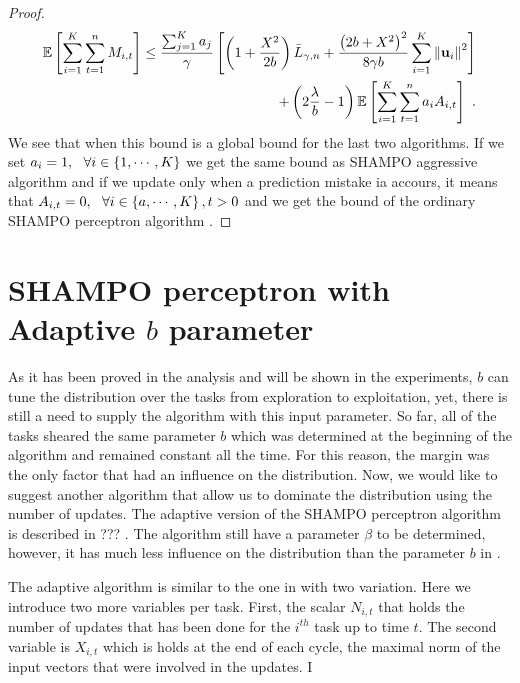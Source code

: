 {\begin{proof}
\begin{equation}
\begin{split}
\mathbb{E}\left[ \sum_{i=1}^{K}\sum_{t=1}^{n}{M_{i,t}} \right]
\le\frac{\sum_{j=1}^Ka_{j}}{\gamma}\left[{\left(1+\frac{X^2}{2b} \right){\bar L}_{\gamma,n}+
\frac{\left({2b+X^2}\right)^2}{8{\gamma}b}\sum_{i=1}^{K}{{\left\Vert \mathbf{u}_{i} \right\Vert}^2}}\right]\\ 
+
\left({2\frac{\lambda}{b}-1}\right)\mathbb{E}\left[{\sum_{i=1}^{K}\sum_{t=1}^{n}{a_{i}A_{i,t}}}\right]~.
\end{split}
\label{final_eq_prior}
\end{equation}
We see that when this  bound is a global bound for the last two algorithms. If we set $a_i=1, ~~\forall i\in\left\{{1,\cdots,K}\right\}$ we get the same bound as  SHAMPO aggressive algorithm and if we update only when a prediction mistake ia accours, it means that $A_{i,t}=0,~~\forall i\in\left\{{a,\cdots,K}\right\},t>0$ and we get the bound of  the ordinary SHAMPO perceptron algorithm  .
\QED
\end{proof}


\section{SHAMPO perceptron with Adaptive $b$ parameter}

As it has been proved in the analysis and will be shown in the experiments, $b$ can tune the distribution over the tasks from exploration to exploitation, yet, there is still a need to supply the algorithm with this input parameter. So far, all of the tasks sheared the same parameter $b$ which was determined at the beginning of the algorithm and remained constant all the time. For this reason, the margin was the only factor that had an influence on the distribution. Now, we would like to suggest another algorithm that allow us to  dominate the distribution using the number of updates. The adaptive version of the  SHAMPO perceptron algorithm is  described in  ??? . The algorithm still have a parameter $\beta$ to be determined, however, it has much less influence on the distribution than the parameter $b$ in  .

The adaptive algorithm is similar to the one in  with two variation. Here we introduce two more variables per task. First, the scalar $N_{i,t}$ that holds the number of updates that has been done for the $i^{th}$ task  up to time $t$. The second variable is $X_{i,t}$ which is holds at the end of each cycle,  the maximal norm of the input vectors that were involved in the updates. I

}
